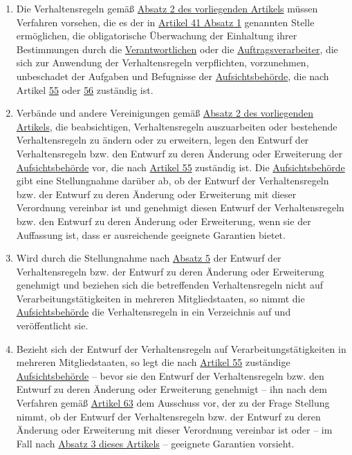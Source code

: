 \begin{enumerate}
  \item Die Verhaltensregeln gemäß \hyperref[itm:40-2]{Absatz 2 des vorliegenden Artikels} müssen Verfahren vorsehen,
   die es der in \hyperref[itm:41-2]{Artikel 41 Absatz 1} genannten Stelle ermöglichen, die obligatorische Überwachung
   der Einhaltung ihrer Bestimmungen durch die \hyperref[itm:04-7]{Verantwortlichen} oder die \hyperref[itm:04-8]
   {Auftragsverarbeiter}, die sich zur Anwendung der Verhaltensregeln verpflichten, vorzunehmen, unbeschadet der
   Aufgaben und Befugnisse der \hyperref[itm:04-21]{Aufsichtsbehörde}, die nach Artikel \hyperref[ch:55]
   {55} oder \hyperref[ch:56]{56} zuständig ist.%
  \label{itm:40-4}

  \item Verbände und andere Vereinigungen gemäß \hyperref[itm:40-2]{Absatz 2 des vorliegenden Artikels}, die
   beabsichtigen, Verhaltensregeln auszuarbeiten oder bestehende Verhaltensregeln zu ändern oder zu erweitern, legen
   den Entwurf der Verhaltensregeln bzw. den Entwurf zu deren Änderung oder Erweiterung der \hyperref[itm:04-21]
   {Aufsichtsbehörde} vor, die nach \hyperref[ch:55]{Artikel 55} zuständig ist. Die \hyperref[itm:04-21]
   {Aufsichtsbehörde} gibt eine Stellungnahme darüber ab, ob der Entwurf der Verhaltensregeln bzw. der Entwurf zu deren
   Änderung oder Erweiterung mit dieser Verordnung vereinbar ist und genehmigt diesen Entwurf der Verhaltensregeln bzw.
   den Entwurf zu deren Änderung oder Erweiterung, wenn sie der Auffassung ist, dass er ausreichende geeignete
   Garantien bietet.%
  \label{itm:40-5}

  \item Wird durch die Stellungnahme nach \hyperref[itm:40-5]{Absatz 5} der Entwurf der Verhaltensregeln bzw. der
   Entwurf zu deren Änderung oder Erweiterung genehmigt und beziehen sich die betreffenden Verhaltensregeln nicht auf
   Verarbeitungstätigkeiten in mehreren Mitgliedstaaten, so nimmt die \hyperref[itm:04-21]{Aufsichtsbehörde} die
   Verhaltensregeln in ein Verzeichnis auf und veröffentlicht sie.%
  \label{itm:40-6}

  \item Bezieht sich der Entwurf der Verhaltensregeln auf Verarbeitungstätigkeiten in mehreren Mitgliedstaaten, so legt
   die nach \hyperref[ch:55]{Artikel 55} zuständige \hyperref[itm:04-21]{Aufsichtsbehörde} -- bevor sie den Entwurf der
   Verhaltensregeln bzw. den Entwurf zu deren Änderung oder Erweiterung genehmigt -- ihn nach dem Verfahren
   gemäß \hyperref[ch:63]{Artikel 63} dem Ausschuss vor, der zu der Frage Stellung nimmt, ob der Entwurf der
   Verhaltensregeln bzw. der Entwurf zu deren Änderung oder Erweiterung mit dieser Verordnung vereinbar ist oder -- im
   Fall nach \hyperref[itm:40-3]{Absatz 3 dieses Artikels} -- geeignete Garantien vorsieht.%
  \label{itm:40-7}


\end{enumerate}
